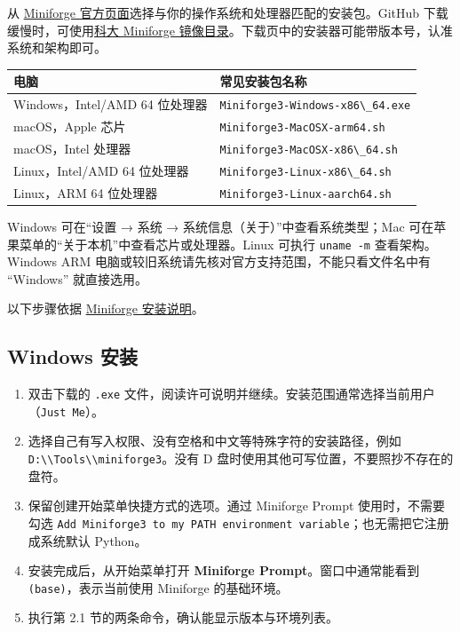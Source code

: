 \documentclass[UTF8,a4paper,11pt,fontset=fandol]{ctexart}
\providecommand{\tightlist}{\setlength{\itemsep}{0pt}\setlength{\parskip}{0pt}}
\providecommand{\passthrough}[1]{#1}
\begin{document}
从 \href{https://github.com/conda-forge/miniforge\#requirements-and-installers}{Miniforge 官方页面}选择与你的操作系统和处理器匹配的安装包。GitHub 下载缓慢时，可使用\href{https://mirrors.ustc.edu.cn/github-release/conda-forge/miniforge/LatestRelease/}{科大 Miniforge 镜像目录}。下载页中的安装器可能带版本号，认准系统和架构即可。

\begin{longtable}[]{@{}ll@{}}
\toprule\noalign{}
电脑 & 常见安装包名称 \\
\midrule\noalign{}
\endhead
\bottomrule\noalign{}
\endlastfoot
Windows，Intel/AMD 64 位处理器 & \passthrough{\lstinline!Miniforge3-Windows-x86\_64.exe!} \\
macOS，Apple 芯片 & \passthrough{\lstinline!Miniforge3-MacOSX-arm64.sh!} \\
macOS，Intel 处理器 & \passthrough{\lstinline!Miniforge3-MacOSX-x86\_64.sh!} \\
Linux，Intel/AMD 64 位处理器 & \passthrough{\lstinline!Miniforge3-Linux-x86\_64.sh!} \\
Linux，ARM 64 位处理器 & \passthrough{\lstinline!Miniforge3-Linux-aarch64.sh!} \\
\end{longtable}

Windows 可在``设置 → 系统 → 系统信息（关于）''中查看系统类型；Mac 可在苹果菜单的``关于本机''中查看芯片或处理器。Linux 可执行 \passthrough{\lstinline!uname -m!} 查看架构。Windows ARM 电脑或较旧系统请先核对官方支持范围，不能只看文件名中有 ``Windows'' 就直接选用。

以下步骤依据 \href{https://github.com/conda-forge/miniforge\#install}{Miniforge 安装说明}。

\subsection{Windows 安装}\label{windows-ux5b89ux88c5}

\begin{enumerate}
\def\labelenumi{\arabic{enumi}.}
\tightlist
\item
  双击下载的 \passthrough{\lstinline!.exe!} 文件，阅读许可说明并继续。安装范围通常选择当前用户（\passthrough{\lstinline!Just Me!}）。
\item
  选择自己有写入权限、没有空格和中文等特殊字符的安装路径，例如 \passthrough{\lstinline!D:\\Tools\\miniforge3!}。没有 D 盘时使用其他可写位置，不要照抄不存在的盘符。
\item
  保留创建开始菜单快捷方式的选项。通过 Miniforge Prompt 使用时，不需要勾选 \passthrough{\lstinline!Add Miniforge3 to my PATH environment variable!}；也无需把它注册成系统默认 Python。
\item
  安装完成后，从开始菜单打开 \textbf{Miniforge Prompt}。窗口中通常能看到 \passthrough{\lstinline!(base)!}，表示当前使用 Miniforge 的基础环境。
\item
  执行第 2.1 节的两条命令，确认能显示版本与环境列表。
\end{enumerate}
\end{document}
